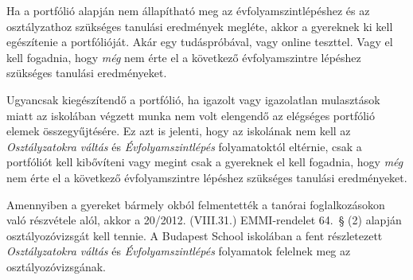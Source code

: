 Ha a portfólió alapján nem állapítható meg az évfolyamszintlépéshez és az osztályzathoz szükséges tanulási eredmények megléte, akkor a gyereknek ki kell egészítenie a portfólióját. Akár egy tudáspróbával, vagy online teszttel. Vagy el kell fogadnia, hogy \emph{még} nem érte el a következő évfolyamszintre lépéshez szükséges tanulási eredményeket.

Ugyancsak kiegészítendő a portfólió, ha igazolt vagy igazolatlan mulasztások miatt az iskolában végzett munka nem volt elengendő az elégséges portfólió elemek összegyűjtésére. Ez azt is jelenti, hogy az iskolának nem kell az \emph{Osztályzatokra váltás} és \emph{Évfolyamszintlépés} folyamatoktól eltérnie, csak a portfóliót kell kibővíteni vagy megint csak a gyereknek el kell fogadnia, hogy \emph{még} nem érte el a következő évfolyamszintre lépéshez szükséges tanulási eredményeket.

Amennyiben a gyereket bármely okból felmentették a tanórai foglalkozásokon való részvétele alól, akkor a 20/2012. (VIII.31.) EMMI-rendelet 64.~§ (2)  alapján osztályozóvizsgát kell tennie. A Budapest School iskolában a fent részletezett \emph{Osztályzatokra váltás} és \emph{Évfolyamszintlépés} folyamatok  felelnek meg az osztályozóvizsgának.
